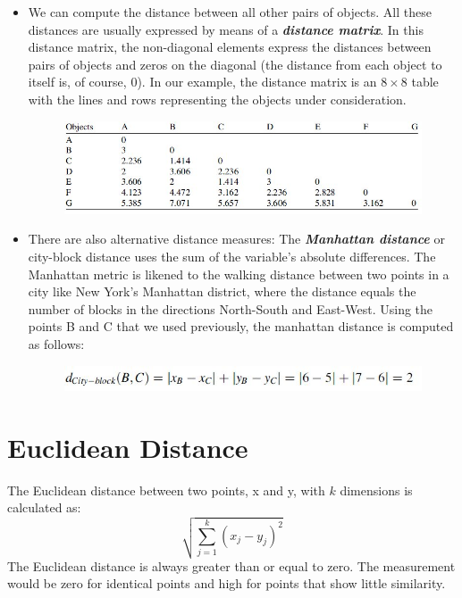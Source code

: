 \documentclass[a4paper,12pt]{report}
\begin{document}
\begin{itemize}
	\item We can compute the distance between all other pairs of objects. All
	these distances are usually expressed by means of a \textit{\textbf{distance matrix}}. In this distance
	matrix, the non-diagonal elements express the distances between pairs of objects
	and zeros on the diagonal (the distance from each object to itself is, of course, 0). In
	our example, the distance matrix is an $8 \times 8$ table with the lines and rows
	representing the objects under consideration.
	\begin{figure}[h!]
		\begin{center}
			\includegraphics[scale=0.6]{images/DistanceMatrix.jpg}\\
		\end{center}
	\end{figure}
	
	\item There are also alternative distance measures: The \textbf{\textit{Manhattan distance}} or city-block distance uses the sum of the variable's absolute differences. The Manhattan metric is likened to the walking distance between two points in a city like New York's
	Manhattan district, where the distance equals the number of blocks in the directions
	North-South and East-West. Using the points B and C that we used previously, the manhattan distance is computed as follows:
	\begin{figure}[h!]
		\begin{center}
			\includegraphics[scale=0.6]{images/Manhattan.jpg}\\
		\end{center}
	\end{figure}
	
	
	
	
	
	
\end{itemize}

\section{Euclidean Distance}
The Euclidean distance between two points, x and y, with $k$ dimensions is calculated as:
\[ \sqrt{ \sum^{k}_{j=1} ( x_j - y_j)^2 } \]
The Euclidean distance is always greater than or equal to zero. The measurement would be zero for identical points and high for points that show little similarity.
\end{document}
